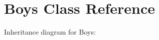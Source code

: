 \hypertarget{classBoys}{}\section{Boys Class Reference}
\label{classBoys}


Inheritance diagram for Boys\+:
